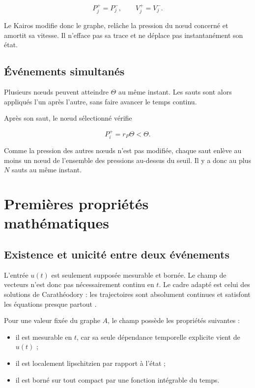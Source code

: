 \[
P_j^+=P_j^-,
\qquad
V_j^+=V_j^-.
\]

Le Kairos modifie donc le graphe, relâche la pression du nœud concerné et amortit sa vitesse. Il n'efface pas sa trace et ne déplace pas instantanément son état.

\section{Événements simultanés}\label{t1-evenements-simultanes}

Plusieurs nœuds peuvent atteindre \(\Theta\) au même instant. Les sauts sont alors appliqués l'un après l'autre, sans faire avancer le temps continu.

Après son saut, le nœud sélectionné vérifie

\[
P_i^+=r_P\Theta<\Theta.
\]

Comme la pression des autres nœuds n'est pas modifiée, chaque saut enlève au moins un nœud de l'ensemble des pressions au-dessus du seuil. Il y a donc au plus \(N\) sauts au même instant.

\chapter{Premières propriétés mathématiques}\label{t1-premieres-proprietes-mathematiques}

\section{Existence et unicité entre deux événements}\label{t1-existence-et-unicite-entre-deux-evenements}

L'entrée \(u(t)\) est seulement supposée mesurable et bornée. Le champ de vecteurs n'est donc pas nécessairement continu en \(t\). Le cadre adapté est celui des solutions de Carathéodory : les trajectoires sont absolument continues et satisfont les équations presque partout \cite{filippov1988differential}.

Pour une valeur fixée du graphe \(A\), le champ possède les propriétés suivantes :

\begin{itemize}
\tightlist
\item
  il est mesurable en \(t\), car sa seule dépendance temporelle
  explicite vient de \(u(t)\) ;
\item
  il est localement lipschitzien par rapport à l'état ;
\item
  il est borné sur tout compact par une fonction intégrable du temps.
\end{itemize}

